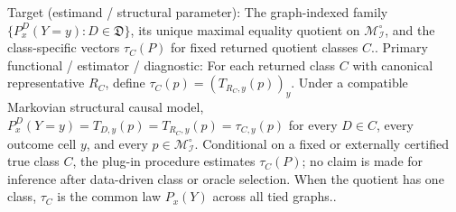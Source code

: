\documentclass{article}
\begin{document}
Target (estimand / structural parameter): The graph-indexed family \(\{P_x^D(Y=y):D\in\mathfrak D\}\), its unique maximal equality quotient on \(\mathcal M_{\mathcal I}^{\circ}\), and the class-specific vectors \(\tau_C(P)\) for fixed returned quotient classes \(C\)..
Primary functional / estimator / diagnostic: For each returned class \(C\) with canonical representative \(R_C\), define \(\tau_C(p)=(T_{R_C,y}(p))_y\). Under a compatible Markovian structural causal model, \(P_x^D(Y=y)=T_{D,y}(p)=T_{R_C,y}(p)=\tau_{C,y}(p)\) for every \(D\in C\), every outcome cell \(y\), and every \(p\in\mathcal M_{\mathcal I}^{\circ}\). Conditional on a fixed or externally certified true class \(C\), the plug-in procedure estimates \(\tau_C(P)\); no claim is made for inference after data-driven class or oracle selection. When the quotient has one class, \(\tau_C\) is the common law \(P_x(Y)\) across all tied graphs..
\end{document}
